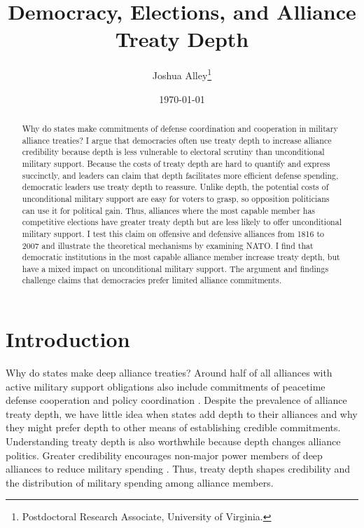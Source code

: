\documentclass[12pt]{article}
\title{\textbf{Democracy, Elections, and Alliance Treaty Depth}}
\author{Joshua Alley\footnote{Postdoctoral Research Associate,
University of Virginia.}}
\date{\today}
\begin{document}
\maketitle 

\doublespace 

\begin{abstract}
Why do states make commitments of defense coordination and cooperation in military alliance treaties? 
I argue that democracies often use treaty depth to increase alliance credibility because depth is less vulnerable to electoral scrutiny than unconditional military support. 
Because the costs of treaty depth are hard to quantify and express succinctly, and leaders can claim that depth facilitates more efficient defense spending, democratic leaders use treaty depth to reassure. 
Unlike depth, the potential costs of unconditional military support are easy for voters to grasp, so opposition politicians can use it for political gain. 
Thus, alliances where the most capable member has competitive elections have greater treaty depth but are less likely to offer unconditional military support. 
I test this claim on offensive and defensive alliances from 1816 to 2007 and illustrate the theoretical mechanisms by examining NATO. 
I find that democratic institutions in the most capable alliance member increase treaty depth, but have a mixed impact on unconditional military support. 
The argument and findings challenge claims that democracies prefer limited alliance commitments. 
\end{abstract}


\newpage 


\section{Introduction}


Why do states make deep alliance treaties? 
Around half of all alliances with active military support obligations also include commitments of peacetime defense cooperation and policy coordination \citep{Leedsetal2002}. 
Despite the prevalence of alliance treaty depth, we have little idea when states add depth to their alliances and why they might prefer depth to other means of establishing credible commitments.
Understanding treaty depth is also worthwhile because depth changes alliance politics. 
Greater credibility encourages non-major power members of deep alliances to reduce military spending \citep{Alley2020}.  
Thus, treaty depth shapes credibility and the distribution of military spending among alliance members. 
\end{document}
